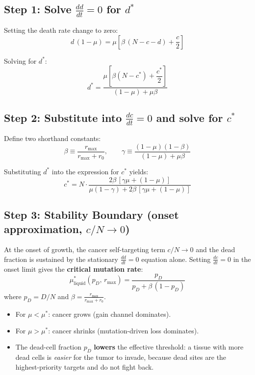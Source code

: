 \documentclass[11pt,a4paper]{article}
\begin{document}
\subsection{Step 1: Solve $\frac{dd}{dt} = 0$ for $d^*$}

Setting the death rate change to zero:
\begin{equation}
d\,(1-\mu) = \mu\left[\beta\,(N - c - d) + \frac{c}{2}\right]
\end{equation}

Solving for $d^*$:
\begin{equation}
\boxed{d^* = \frac{\mu\left[\beta(N - c^*) + \dfrac{c^*}{2}\right]}{(1-\mu) + \mu\beta}}
\end{equation}

\subsection{Step 2: Substitute into $\frac{dc}{dt} = 0$ and solve for $c^*$}

Define two shorthand constants:
\begin{equation}
\beta \equiv \frac{r_{\max}}{r_{\max} + r_0}, \qquad \gamma \equiv \frac{(1-\mu)(1-\beta)}{(1-\mu)+\mu\beta}
\end{equation}

Substituting $d^*$ into the expression for $c^*$ yields:
\begin{equation}
\boxed{c^* = N \cdot \frac{2\beta\,[\gamma\mu + (1-\mu)]}{\mu(1-\gamma) + 2\beta\,[\gamma\mu + (1-\mu)]}}
\end{equation}

\subsection{Step 3: Stability Boundary (onset approximation, $c/N \rightarrow 0$)}

At the onset of growth, the cancer self-targeting term $c/N \rightarrow 0$ and the dead fraction is sustained by the stationary $\frac{dd}{dt} = 0$ equation alone. Setting $\frac{dc}{dt} = 0$ in the onset limit gives the \textbf{critical mutation rate}:
\begin{equation}
\boxed{\mu^*_{\text{liquid}}(p_D,\, r_{\max}) = \frac{p_D}{p_D + \beta\,(1 - p_D)}}
\end{equation}
where $p_D = D/N$ and $\beta = \frac{r_{\max}}{r_{\max}+r_0}$.

\begin{itemize}
    \item For $\mu < \mu^*$: cancer grows (gain channel dominates).
    \item For $\mu > \mu^*$: cancer shrinks (mutation-driven loss dominates).
    \item The dead-cell fraction $p_D$ \textbf{lowers} the effective threshold: a tissue with more dead cells is \textit{easier} for the tumor to invade, because dead sites are the highest-priority targets and do not fight back.
\end{itemize}
\end{document}
